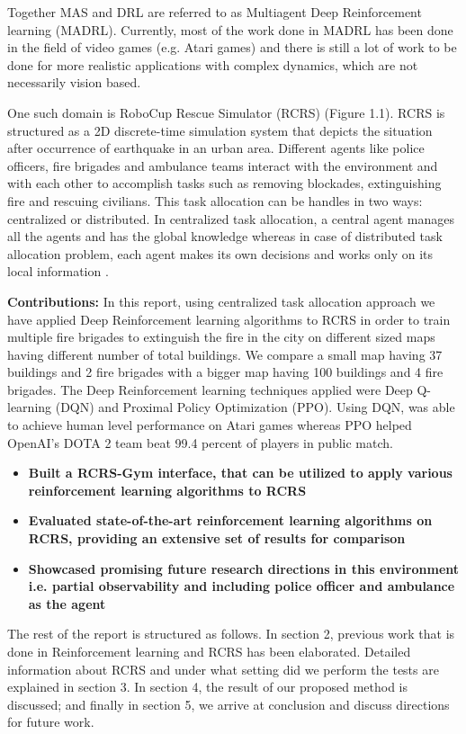 \documentclass[12pt]{report}
\begin{document}
Together MAS and DRL are referred to as Multiagent Deep Reinforcement learning (MADRL). Currently, most of the work done in MADRL has been done in the field of video games (e.g. Atari games) and there is still a lot of work to be done for more realistic applications with complex dynamics, which are not necessarily vision based. 

One such domain is RoboCup Rescue Simulator (RCRS) (Figure 1.1). RCRS is structured as a 2D discrete-time simulation system that depicts the situation after occurrence of earthquake in an urban area. Different agents like police officers, fire brigades and ambulance teams interact with the environment and with each other to accomplish tasks such as removing blockades, extinguishing fire and rescuing civilians. This task allocation can be handles in two ways: centralized or distributed. In centralized task allocation, a central agent manages all the agents and has the global knowledge whereas in case of distributed task allocation problem, each agent makes its own decisions and works only on its local information \cite{Nair}. 

\textbf{Contributions:} In this report, using centralized task allocation approach we have applied Deep Reinforcement learning algorithms to RCRS in order to train multiple fire brigades to extinguish the fire in the city on different sized maps having different number of total buildings. We compare a small map having 37 buildings and 2 fire brigades with a bigger map having 100 buildings and 4 fire brigades. The Deep Reinforcement learning techniques applied were Deep Q-learning (DQN) and Proximal Policy Optimization (PPO). Using DQN, \cite{mnih} was able to achieve human level performance on Atari games whereas PPO helped OpenAI's DOTA 2 team beat 99.4 percent of players in public match. 

\begin{itemize}
    \item \textbf{Built a RCRS-Gym interface, that can be utilized to apply various reinforcement learning algorithms to RCRS}
    \item \textbf{Evaluated state-of-the-art reinforcement learning algorithms on RCRS, providing an extensive set of results for comparison}
    \item \textbf{Showcased promising future research directions in this environment i.e. partial observability and including police officer and ambulance as the agent}
\end{itemize}

The rest of the report is structured as follows. In section 2, previous work that is done in Reinforcement learning and RCRS has been elaborated. Detailed information about RCRS and under what setting did we perform the tests are explained in section 3. In section 4, the result of our proposed method is discussed; and finally in section 5, we arrive at conclusion and discuss directions for future work.
\end{document}
